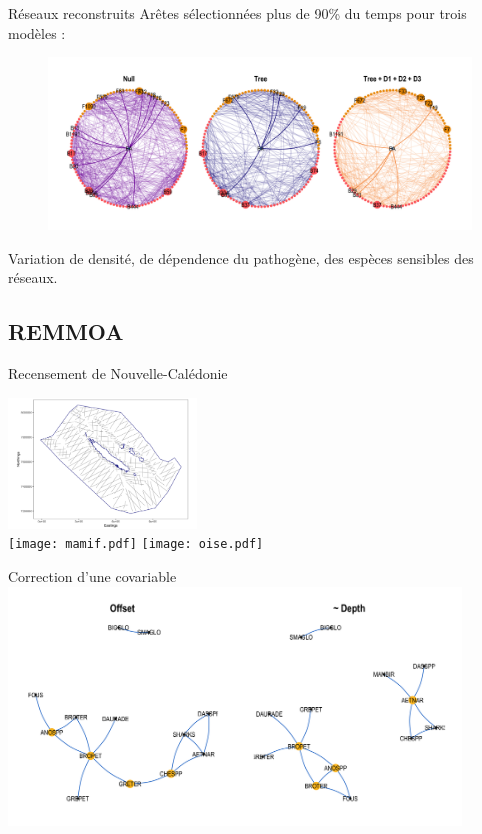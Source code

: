 \documentclass[11pt]{beamer}
\begin{document}
\begin{frame}{Réseaux reconstruits}
Arêtes sélectionnées plus de 90\% du temps pour trois modèles :
    \begin{figure}[htp]
\centering
\includegraphics[width=12cm]{Oaknet_90_btw.png}
\end{figure}
Variation de densité, de dépendence du pathogène, des espèces sensibles des réseaux.
\end{frame}

\subsection{REMMOA}
\begin{frame}{Recensement de Nouvelle-Calédonie}
\begin{center}

\includegraphics[width=5cm]{carte_vierge2.png} \\
\texttt{[image: mamif.pdf]} \hspace{2cm}
\texttt{[image: oise.pdf]}
\end{center}

\end{frame}

\begin{frame}{Correction d'une covariable}
\center
\includegraphics[width=12cm]{entier_covar.png}\\

\end{frame}
\end{document}
